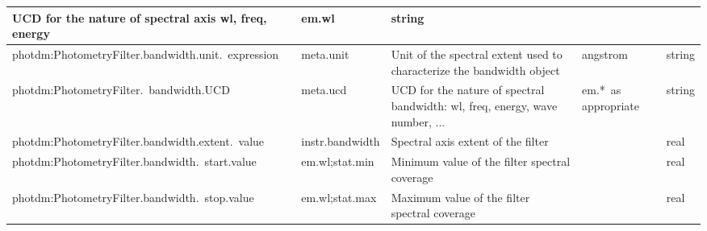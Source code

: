 \documentclass[11pt,a4paper]{ivoa}
\begin{document}
\begin{appendices}
\begin{table}[H]
\begin{adjustbox}{angle=90}
\begin{tabular}{p{2.5in}|p{1.5in}|p{2in}|p{0.74in}|p{0.35in}}
\multicolumn{1}{p{2in}}{{\fontsize{8pt}{8pt}\selectfont UCD for the nature of
spectral axis wl, freq, energy}} &
\multicolumn{1}{p{0.74in}}{{\fontsize{8pt}{8pt}\selectfont em.wl}} &
\multicolumn{1}{p{0.35in}}{{\fontsize{8pt}{8pt}\selectfont string}} \\
\hline
\multicolumn{1}{p{2.5in}}{{\fontsize{8pt}{8pt}
\selectfont photdm:PhotometryFilter.bandwidth.unit.\ expression}} &
\multicolumn{1}{p{1.5in}}{{\fontsize{8pt}{8pt}\selectfont meta.unit}} &
\multicolumn{1}{p{2in}}{{\fontsize{8pt}{8pt}\selectfont Unit of the spectral extent
used to characterize the bandwidth object}} &
\multicolumn{1}{p{0.74in}}{{\fontsize{8pt}{8pt}\selectfont angstrom}} &
\multicolumn{1}{p{0.35in}}{{\fontsize{8pt}{8pt}\selectfont string}} \\
\hline
\multicolumn{1}{p{2.5in}}{
{\fontsize{8pt}{8pt}\selectfont photdm:PhotometryFilter.\ bandwidth.UCD}} &
\multicolumn{1}{p{1.5in}}{{\fontsize{8pt}{8pt}\selectfont meta.ucd }} &
\multicolumn{1}{p{2in}}{{\fontsize{8pt}{8pt}\selectfont UCD for the nature of
spectral bandwidth: wl, freq, energy, wave number, ...}} &
\multicolumn{1}{p{0.74in}}{{\fontsize{8pt}{8pt}\selectfont em.*\ as appropriate}} &
\multicolumn{1}{p{0.35in}}{{\fontsize{8pt}{8pt}\selectfont string}} \\
\hline
\multicolumn{1}{p{2.5in}}{{\fontsize{8pt}{8pt}\selectfont photdm:PhotometryFilter.bandwidth.extent.\ value}} &
\multicolumn{1}{p{1.5in}}{{\fontsize{8pt}{8pt}\selectfont instr.bandwidth}} &
\multicolumn{1}{p{2in}}{{\fontsize{8pt}{8pt}\selectfont Spectral axis extent of the filter}} &
\multicolumn{1}{p{0.74in}}{} &
\multicolumn{1}{p{0.35in}}{{\fontsize{8pt}{8pt}\selectfont real}} \\
\hline
\multicolumn{1}{p{2.5in}}{{\fontsize{8pt}{8pt}
\selectfont photdm:PhotometryFilter.bandwidth.\ start.value}} &
\multicolumn{1}{p{1.5in}}{{\fontsize{8pt}{8pt}\selectfont em.wl;stat.min}} &
\multicolumn{1}{p{2in}}{{\fontsize{8pt}{8pt}\selectfont Minimum value of the filter
spectral coverage}} &
\multicolumn{1}{p{0.74in}}{} &
\multicolumn{1}{p{0.35in}}{{\fontsize{8pt}{8pt}\selectfont real}} \\
\hline
\multicolumn{1}{p{2.5in}}{{\fontsize{8pt}{8pt}
\selectfont photdm:PhotometryFilter.bandwidth.\ stop.value}} &
\multicolumn{1}{p{1.5in}}{{\fontsize{8pt}{8pt}\selectfont em.wl;stat.max}} &
\multicolumn{1}{p{2in}}{{\fontsize{8pt}{8pt}\selectfont Maximum value of the
filter spectral coverage}} &
\multicolumn{1}{p{0.74in}}{} &
\multicolumn{1}{p{0.35in}}{{\fontsize{8pt}{8pt}\selectfont real}} \\
\hline
\end{tabular}
\end{adjustbox}
 \end{table}



\end{appendices}
\end{document}
